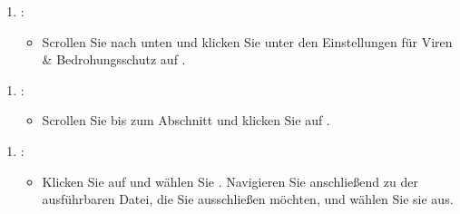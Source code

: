 \documentclass[letterpaper,10pt,german]{sphinxmanual}
\begin{document}
\begin{figure}[htbp]
\centering

\noindent{}
\end{figure}
\begin{enumerate}
%
\setcounter{enumi}{2}
\item {} 
\sphinxAtStartPar
{}:
\begin{itemize}
\item {} 
\sphinxAtStartPar
Scrollen Sie nach unten und klicken Sie unter den Einstellungen für Viren\sphinxhyphen{} \& Bedrohungsschutz auf .

\end{itemize}

\end{enumerate}

\begin{figure}[htbp]
\centering

\noindent{}
\end{figure}
\begin{enumerate}
%
\setcounter{enumi}{3}
\item {} 
\sphinxAtStartPar
{}:
\begin{itemize}
\item {} 
\sphinxAtStartPar
Scrollen Sie bis zum Abschnitt  und klicken Sie auf .

\end{itemize}

\end{enumerate}

\begin{figure}[htbp]
\centering

\noindent{}
\end{figure}
\begin{enumerate}
%
\setcounter{enumi}{4}
\item {} 
\sphinxAtStartPar
{}:
\begin{itemize}
\item {} 
\sphinxAtStartPar
Klicken Sie auf  und wählen Sie . Navigieren Sie anschließend zu der ausführbaren Datei, die Sie ausschließen möchten, und wählen Sie sie aus.

\end{itemize}

\end{enumerate}
\end{document}

